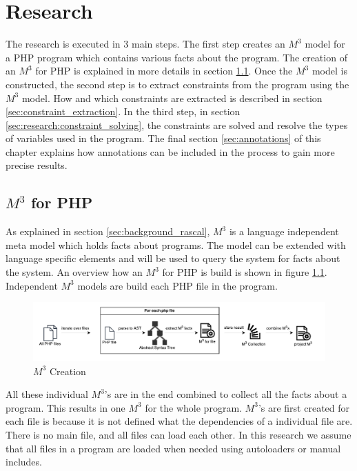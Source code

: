 \documentclass[../main.tex]{subfiles}
\begin{document}
    \chapter{Research}\label{ch:research}

    The research is executed in 3 main steps.
    The first step creates an $M^3$ model for a PHP program which contains various facts about the program. 
    The creation of an $M^3$ for PHP is explained in more details in section \ref{sec:m3_for_php}.
    Once the $M^3$ model is constructed, the second step is to extract constraints from the program using the $M^3$ model. How and which constraints are extracted is described in section \ref{sec:constraint_extraction}.
    In the third step, in section \ref{sec:research:constraint_solving}, the constraints are solved and resolve the types of variables used in the program.
    The final section \ref{sec:annotations} of this chapter explains how annotations can be included in the process to gain more precise results.
    
    \section{$M^3$ for PHP}\label{sec:m3_for_php}
    As explained in section \ref{sec:background_rascal}, $M^3$ is a language independent meta model which holds facts about programs.
    The model can be extended with language specific elements and will be used to query the system for facts about the system.
    An overview how an $M^3$ for PHP is build is shown in figure \ref{fig:research_m3_creation}.
    Independent $M^3$ models are build each PHP file in the program.
    
    \begin{figure}[H]
        \centerline{\includegraphics{Diagrams/M3Creation.pdf}}
        \caption{$M^3$ Creation}
        \label{fig:research_m3_creation}
    \end{figure}
    
    All these individual $M^3$'s are in the end combined to collect all the facts about a program.
    This results in one $M^3$ for the whole program.
    $M^3$'s are first created for each file is because it is not defined what the dependencies of a individual file are.
    There is no main file, and all files can load each other.
    In this research we assume that all files in a program are loaded when needed using autoloaders or manual includes.
    
\end{document}
